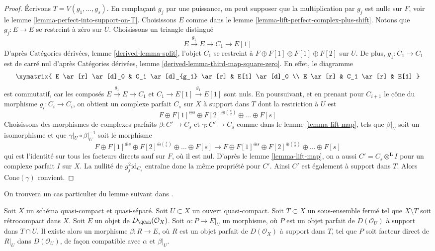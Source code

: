 \begin{proof}
Écrivons $T = V(g_1, \ldots, g_s)$. En remplaçant $g_j$ par une puissance,
on peut supposer que la multiplication par $g_j$ est nulle sur $F$, voir le
lemme \ref{lemma-perfect-into-support-on-T}. Choisissons $E$ comme dans le
lemme \ref{lemma-lift-perfect-complex-plus-shift}.
Notons que $g_j : E \to E$ se restreint à zéro sur $U$.
Choisissons un triangle distingué
$$
E \xrightarrow{g_1} E \to C_1 \to E[1]
$$
D'après Catégories dérivées, lemme \ref{derived-lemma-split},
l'objet $C_1$ se restreint à
$F \oplus F[1] \oplus F[1] \oplus F[2]$ sur $U$.
De plus, $g_1 : C_1 \to C_1$ est de carré nul d'après
Catégories dérivées, lemme \ref{derived-lemma-third-map-square-zero}.
En effet, le diagramme
$$
\xymatrix{
E \ar[r] \ar[d]_0 & C_1 \ar[d]_{g_1} \ar[r] & E[1] \ar[d]_0 \\
E \ar[r] & C_1 \ar[r] & E[1]
}
$$
est commutatif, car les composés $E \xrightarrow{g_1} E \to C_1$ et
$C_1 \to E[1] \xrightarrow{g_1} E[1]$ sont nuls. En poursuivant, et en prenant
pour $C_{i + 1}$ le cône du morphisme $g_i : C_i \to C_i$, on obtient
un complexe parfait $C_s$ sur $X$ à support dans $T$
dont la restriction à $U$ est
$$
F \oplus F[1]^{\oplus s} \oplus F[2]^{\oplus {s \choose 2}}
\oplus \ldots \oplus F[s]
$$
Choisissons des morphismes de complexes parfaits $\beta : C' \to C_s$
et $\gamma : C' \to C_s$ comme dans le lemme \ref{lemma-lift-map},
tels que $\beta|_U$ soit un isomorphisme et que
$\gamma|_U \circ \beta|_U^{-1}$ soit le morphisme
$$
F \oplus F[1]^{\oplus s} \oplus F[2]^{\oplus {s \choose 2}}
\oplus \ldots \oplus F[s]
\to
F \oplus F[1]^{\oplus s} \oplus F[2]^{\oplus {s \choose 2}}
\oplus \ldots \oplus F[s]
$$
qui est l'identité sur tous les facteurs directs sauf sur $F$, où il est nul.
D'après le lemme \ref{lemma-lift-map}, on a aussi
$C' = C_s \otimes^\mathbf{L} I$ pour un complexe parfait
$I$ sur $X$. La nullité de $g_j^2\text{id}_{C_s}$ entraîne donc la
même propriété pour $C'$. Ainsi $C'$ est également à support dans $T$.
Alors $\text{Cone}(\gamma)$ convient.
\end{proof}

\noindent
On trouvera un cas particulier du lemme suivant dans
\cite{Neeman-Grothendieck}.

\begin{lemma}
\label{lemma-lift-map-from-perfect-complex-with-support}
Soit $X$ un schéma quasi-compact et quasi-séparé.
Soit $U \subset X$ un ouvert quasi-compact. Soit $T \subset X$
un sous-ensemble fermé tel que $X \setminus T$ soit rétrocompact dans $X$.
Soit $E$ un objet de $D_\QCoh(\mathcal{O}_X)$.
Soit $\alpha : P \to E|_U$ un morphisme, où $P$ est un objet parfait de
$D(\mathcal{O}_U)$ à support dans $T \cap U$. Il existe alors un morphisme
$\beta : R \to E$, où $R$ est un objet parfait de $D(\mathcal{O}_X)$
à support dans $T$, tel que $P$ soit facteur direct de $R|_U$ dans
$D(\mathcal{O}_U)$, de façon compatible avec $\alpha$ et $\beta|_U$.
\end{lemma}

